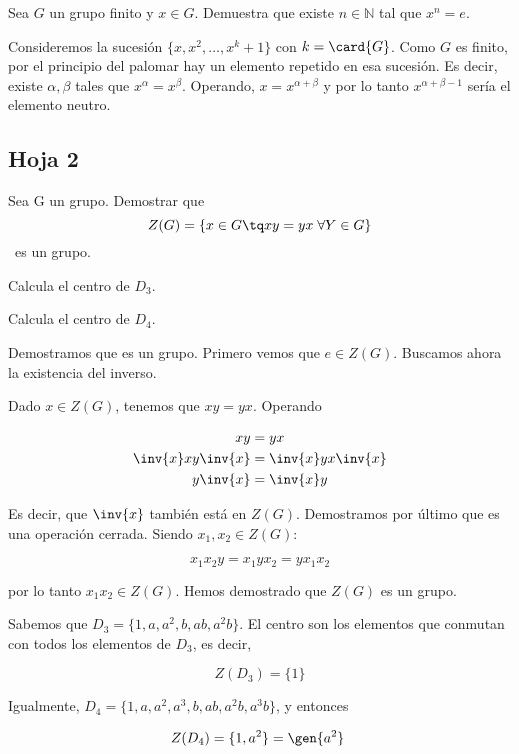 \begin{problem}[14] Sea $G$ un grupo finito y $x∈G$. Demuestra que existe $n∈ℕ$ tal que $x^n = e$.
\solution

Consideremos la sucesión $\{x,x^2,\dotsc,x^k+1\}$ con $k=\card{G}$. Como $G$ es finito, por el principio del palomar hay un elemento repetido en esa sucesión. Es decir, existe $α,β$ tales que $x^α=x^β$. Operando, $x = x^{α+β}$ y por lo tanto $x^{α+β-1}$ sería el elemento neutro.
\end{problem}

\subsection{Hoja 2}
\begin{problem}[4]
Sea G un grupo. Demostrar que \[ Z(G) = \{x \in G \tq xy = yx\; \forall Y \in G\} \] es un grupo. 

\ppart Calcula el centro de $D_3$.

\ppart Calcula el centro de $D_4$.

\solution

Demostramos que es un grupo. Primero vemos que $e \in Z(G)$. Buscamos ahora la existencia del inverso.

Dado $x∈Z(G)$, tenemos que $xy = yx$. Operando 

\begin{align*}
xy &= yx \\
\inv{x}xy\inv{x} &= \inv{x}yx\inv{x} \\
y \inv{x} &= \inv{x} y
\end{align*}

Es decir, que $\inv{x}$ también está en $Z(G)$. Demostramos por último que es una operación cerrada. Siendo $x_1,x_2∈Z(G)$:

\[ x_1 x_2 y = x_1 y x_2 = y x_1 x_2 \]

por lo tanto $x_1x_2 ∈ Z(G)$. Hemos demostrado que $Z(G)$ es un grupo.

\spart Sabemos que $D_3 = \{ 1,a,a^2,b,ab,a^2b\}$. El centro son los elementos que conmutan con todos los elementos de $D_3$, es decir, 

\[ Z(D_3) = \{ 1 \} \]

\spart Igualmente, $D_4 = \{ 1,a,a^2,a^3,b,ab,a^2b,a^3b \}$, y entonces

\[ Z(D_4) = \{1,a^2\} = \gen{a^2} \]
\end{problem}


